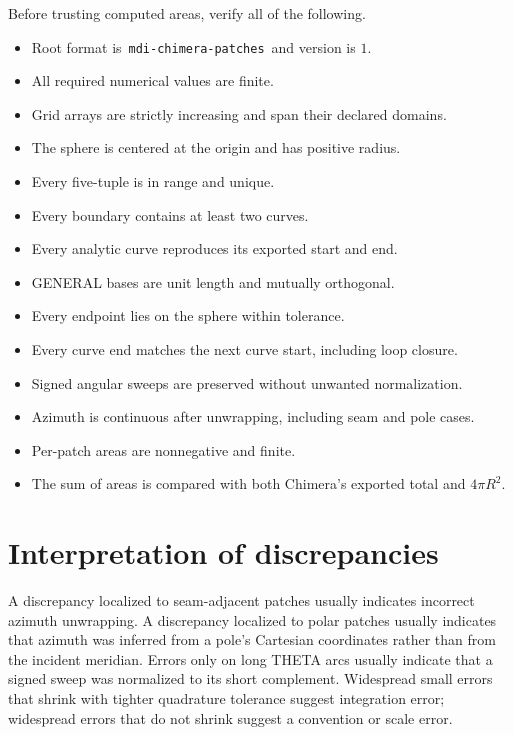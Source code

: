 \documentclass[11pt]{article}
\newcommand{\field}[1]{\texttt{#1}}
\begin{document}
Before trusting computed areas, verify all of the following.

\begin{itemize}[label=$\square$]
  \item Root format is \,\field{mdi-chimera-patches}\, and version is $1$.
  \item All required numerical values are finite.
  \item Grid arrays are strictly increasing and span their declared domains.
  \item The sphere is centered at the origin and has positive radius.
  \item Every five-tuple is in range and unique.
  \item Every boundary contains at least two curves.
  \item Every analytic curve reproduces its exported start and end.
  \item GENERAL bases are unit length and mutually orthogonal.
  \item Every endpoint lies on the sphere within tolerance.
  \item Every curve end matches the next curve start, including loop closure.
  \item Signed angular sweeps are preserved without unwanted normalization.
  \item Azimuth is continuous after unwrapping, including seam and pole cases.
  \item Per-patch areas are nonnegative and finite.
  \item The sum of areas is compared with both Chimera's exported total and
        $4\pi R^2$.
\end{itemize}

\section{Interpretation of discrepancies}

A discrepancy localized to seam-adjacent patches usually indicates incorrect
azimuth unwrapping.  A discrepancy localized to polar patches usually indicates
that azimuth was inferred from a pole's Cartesian coordinates rather than from
the incident meridian.  Errors only on long THETA arcs usually indicate that a
signed sweep was normalized to its short complement.  Widespread small errors
that shrink with tighter quadrature tolerance suggest integration error;
widespread errors that do not shrink suggest a convention or scale error.
\end{document}

